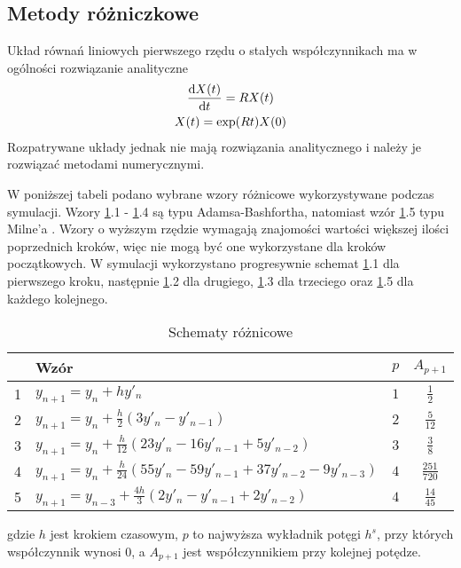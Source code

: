 \documentclass[10pt, a4paper, twoside, onecolumn]{article}
\numberwithin{equation}{section}
\begin{document}
	\subsection{Metody różniczkowe}
	Układ równań liniowych pierwszego rzędu o stałych współczynnikach ma w ogólności rozwiązanie analityczne \cite{palczewski}
	\begin{gather}
		\dv{X(t)}{t}=RX(t) \\
		X(t)=\exp(Rt)X(0)
	\end{gather}
	Rozpatrywane układy jednak nie mają rozwiązania analitycznego i należy je rozwiązać metodami numerycznymi. \par
	W poniższej tabeli podano wybrane wzory różnicowe wykorzystywane podczas symulacji. Wzory \ref{tab:schematy}.1 - \ref{tab:schematy}.4 są typu Adamsa-Bashfortha, natomiast wzór \ref{tab:schematy}.5 typu Milne'a \cite{fortuna}. Wzory o wyższym rzędzie wymagają znajomości wartości większej ilości poprzednich kroków, więc nie mogą być one wykorzystane dla kroków początkowych. W symulacji wykorzystano progresywnie schemat \ref{tab:schematy}.1 dla pierwszego kroku, następnie \ref{tab:schematy}.2 dla drugiego, \ref{tab:schematy}.3 dla trzeciego oraz \ref{tab:schematy}.5 dla każdego kolejnego. 
	\begin{table}[H]\label{tab:schematy}
		\centering
		\begin{tabular}{|l|l|c|c|}
			\hline
			& Wzór & \(p\) & \(A_{p+1}\) \\
			\hline
			1 & \(y_{n+1}=y_{n}+hy'_{n}\) & \(1\) & \(\frac{1}{2}\) \\
			\hline
			2 & \(y_{n+1}=y_{n}+\frac{h}{2}(3y'_{n}-y'_{n-1})\) & \(2\) & \(\frac{5}{12}\) \\
			\hline
			3 & \(y_{n+1}=y_{n}+\frac{h}{12}(23y'_{n}-16y'_{n-1}+5y'_{n-2})\) & \(3\) & \(\frac{3}{8}\) \\
			\hline
			4 & \(y_{n+1}=y_{n}+\frac{h}{24}(55y'_{n}-59y'_{n-1}+37y'_{n-2}-9y'_{n-3})\) & \(4\) & \(\frac{251}{720}\) \\
			\hline
			5 & \(y_{n+1}=y_{n-3}+\frac{4h}{3}(2y'_{n}-y'_{n-1}+2y'_{n-2})\) & \(4\) & \(\frac{14}{45}\) \\
			\hline
		\end{tabular}
		\caption{Schematy różnicowe}
	\end{table}
	gdzie \(h\) jest krokiem czasowym, \(p\) to najwyższa wykładnik potęgi \(h^{s}\), przy których współczynnik wynosi \(0\), a \(A_{p+1}\) jest współczynnikiem przy kolejnej potędze.
	
\end{document}
